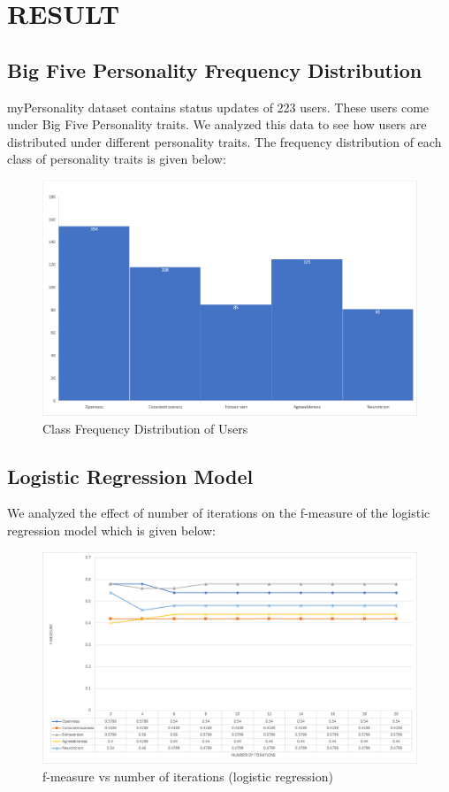 \newpage
\section{RESULT}
\subsection{Big Five Personality Frequency Distribution}
myPersonality dataset contains status updates of 223 users. These users come under Big Five Personality traits. We analyzed this data to see how users are distributed under different personality traits. The frequency distribution of each class of personality traits is given below:
\begin{figure}[!ht]
\centering
\includegraphics[width = \textwidth ]{fig/class_frequency.png}
\caption{Class Frequency Distribution of Users}
\label{fig:class_frequency}
\end{figure}

\subsection{Logistic Regression Model}
We analyzed the effect of number of iterations on the f-measure of the logistic regression model which is given below:
\begin{figure}[!ht]
\centering
\includegraphics[width = \textwidth ]{fig/f-measure_logistic.png}
\caption{f-measure vs number of iterations (logistic regression)}
\label{fig:f-measure_logistic}
\end{figure}


